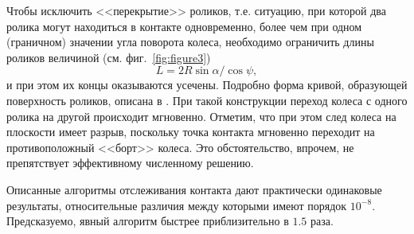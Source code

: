 Чтобы исключить <<перекрытие>> роликов, т.е. ситуацию, при которой два ролика могут находиться в контакте одновременно, более чем при одном (граничном) значении угла поворота колеса, необходимо ограничить длины роликов величиной (см. фиг.~\ref{fig:figure3})
$$
L=2R\sin\alpha / \cos\psi,
$$
и при этом их концы оказываются усечены. Подробно форма кривой, образующей поверхность роликов, описана в \cite{Gfrerrer2008}.
При такой конструкции переход колеса с одного ролика на другой происходит мгновенно.
Отметим, что при этом след колеса на плоскости имеет разрыв, поскольку точка контакта мгновенно переходит на противоположный <<борт>> колеса. Это обстоятельство, впрочем, не препятствует эффективному численному решению.

Описанные алгоритмы отслеживания контакта дают практически одинаковые результаты, относительные различия между которыми имеют порядок $10^{-8}$. Предсказуемо, явный алгоритм быстрее приблизительно в $1.5$ раза.
